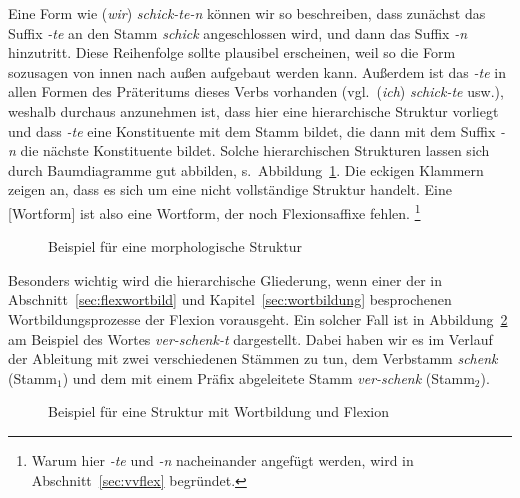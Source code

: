 Eine Form wie (\textit{wir}) \textit{schick-te-n} können wir so beschreiben, dass zunächst das Suffix \textit{-te} an den Stamm \textit{schick} angeschlossen wird, und dann das Suffix \textit{-n} hinzutritt.
Diese Reihenfolge sollte plausibel erscheinen, weil so die Form sozusagen von innen nach außen aufgebaut werden kann.
Außerdem ist das \textit{-te} in allen Formen des Präteritums dieses Verbs vorhanden (vgl.\ (\textit{ich}) \textit{schick-te} usw.), weshalb durchaus anzunehmen ist, dass hier eine hierarchische Struktur vorliegt und dass \textit{-te} eine Konstituente mit dem Stamm bildet, die dann mit dem Suffix \textit{-n} die nächste Konstituente bildet.
Solche hierarchischen Strukturen lassen sich durch Baumdiagramme gut abbilden, s.\ Abbildung~\ref{fig:flextree}.
Die eckigen Klammern zeigen an, dass es sich um eine nicht vollständige Struktur handelt.
Eine [Wortform] ist also eine Wortform, der noch Flexionsaffixe fehlen.%
\footnote{Warum hier \textit{-te} und \textit{-n} nacheinander angefügt werden, wird in Abschnitt~\ref{sec:vvflex} begründet.}

\begin{figure}[!htbp]
  \centering
  \caption{Beispiel für eine morphologische Struktur}
  \label{fig:flextree}
\end{figure}

Besonders wichtig wird die hierarchische Gliederung, wenn einer der in Abschnitt~\ref{sec:flexwortbild} und Kapitel~\ref{sec:wortbildung} besprochenen Wortbildungsprozesse der Flexion vorausgeht.
Ein solcher Fall ist in Abbildung~\ref{fig:flexwbtree} am Beispiel des Wortes \textit{ver-schenk-t} dargestellt.
Dabei haben wir es im Verlauf der Ableitung mit zwei verschiedenen Stämmen zu tun, dem Verbstamm \textit{schenk} (Stamm$_{\text{1}}$) und dem mit einem Präfix abgeleitete Stamm \textit{ver-schenk} (Stamm$_{\text{2}}$).

\begin{figure}[!htbp]
  \centering
  \caption{Beispiel für eine Struktur mit Wortbildung und Flexion}
  \label{fig:flexwbtree}
\end{figure}

